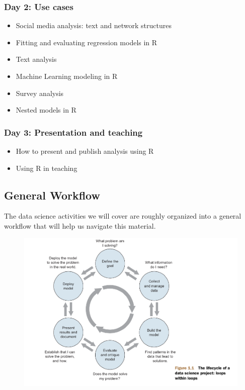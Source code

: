\documentclass[]{article}
\theoremstyle{definition}
\theoremstyle{definition}
\theoremstyle{remark}
\begin{document}
\subsubsection{Day 2: Use cases}\label{day-2-use-cases}

\begin{itemize}
\itemsep1pt\parskip0pt
\item
  Social media analysis: text and network structures
\item
  Fitting and evaluating regression models in R
\item
  Text analysis
\item
  Machine Learning modeling in R
\item
  Survey analysis
\item
  Nested models in R
\end{itemize}

\subsubsection{Day 3: Presentation and
teaching}\label{day-3-presentation-and-teaching}

\begin{itemize}
\itemsep1pt\parskip0pt
\item
  How to present and publish analysis using R
\item
  Using R in teaching
\end{itemize}

\subsection{General Workflow}\label{general-workflow}

The data science activities we will cover are roughly organized into a
general workflow that will help us navigate this material.

\begin{figure}[htbp]
\centering
\includegraphics{img/zumel_mount_cycle.png}
\caption{}
\end{figure}
\end{document}

